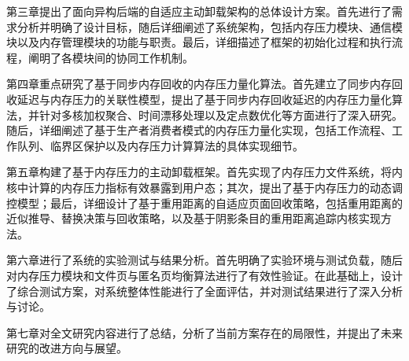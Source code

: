 第三章提出了面向异构后端的自适应主动卸载架构的总体设计方案。首先进行了需求分析并明确了设计目标，随后详细阐述了系统架构，包括内存压力模块、通信模块以及内存管理模块的功能与职责。最后，详细描述了框架的初始化过程和执行流程，阐明了各模块间的协同工作机制。

第四章重点研究了基于同步内存回收的内存压力量化算法。首先建立了同步内存回收延迟与内存压力的关联性模型，提出了基于同步内存回收延迟的内存压力量化算法，并针对多核加权聚合、时间漂移处理以及定点数优化等方面进行了深入研究。随后，详细阐述了基于生产者消费者模式的内存压力量化实现，包括工作流程、工作队列、临界区保护以及内存压力计算算法的具体实现细节。

第五章构建了基于内存压力的主动卸载框架。首先实现了内存压力文件系统，将内核中计算的内存压力指标有效暴露到用户态；其次，提出了基于内存压力的动态调控模型；最后，详细设计了基于重用距离的自适应页面回收策略，包括重用距离的近似推导、替换决策与回收策略，以及基于阴影条目的重用距离追踪内核实现方法。

第六章进行了系统的实验测试与结果分析。首先明确了实验环境与测试负载，随后对内存压力模块和文件页与匿名页均衡算法进行了有效性验证。在此基础上，设计了综合测试方案，对系统整体性能进行了全面评估，并对测试结果进行了深入分析与讨论。

第七章对全文研究内容进行了总结，分析了当前方案存在的局限性，并提出了未来研究的改进方向与展望。


